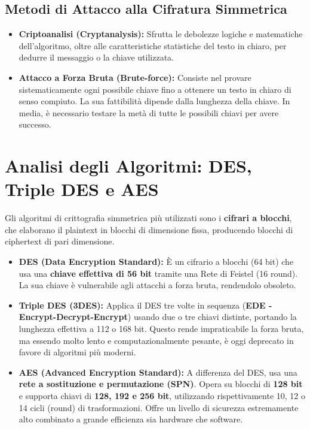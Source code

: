 \subsection{Metodi di Attacco alla Cifratura Simmetrica}
\begin{warnbox}
\begin{itemize}
    \item \textbf{Criptoanalisi (Cryptanalysis):} Sfrutta le debolezze logiche e matematiche dell'algoritmo, oltre alle caratteristiche statistiche del testo in chiaro, per dedurre il messaggio o la chiave utilizzata.
    \item \textbf{Attacco a Forza Bruta (Brute-force):} Consiste nel provare sistematicamente ogni possibile chiave fino a ottenere un testo in chiaro di senso compiuto. La sua fattibilità dipende dalla lunghezza della chiave. In media, è necessario testare la metà di tutte le possibili chiavi per avere successo.
\end{itemize}
\end{warnbox}

\section{Analisi degli Algoritmi: DES, Triple DES e AES}
Gli algoritmi di crittografia simmetrica più utilizzati sono i \textbf{cifrari a blocchi}, che elaborano il plaintext in blocchi di dimensione fissa, producendo blocchi di ciphertext di pari dimensione.

\begin{defbox}
\begin{itemize}
    \item \textbf{DES (Data Encryption Standard):} È un cifrario a blocchi (64 bit) che usa una \textbf{chiave effettiva di 56 bit} tramite una Rete di Feistel (16 round). La sua chiave è vulnerabile agli attacchi a forza bruta, rendendolo obsoleto.
    \item \textbf{Triple DES (3DES):} Applica il DES tre volte in sequenza (\textbf{EDE - Encrypt-Decrypt-Encrypt}) usando due o tre chiavi distinte, portando la lunghezza effettiva a 112 o 168 bit. Questo rende impraticabile la forza bruta, ma essendo molto lento e computazionalmente pesante, è oggi deprecato in favore di algoritmi più moderni.
    \item \textbf{AES (Advanced Encryption Standard):} A differenza del DES, usa una \textbf{rete a sostituzione e permutazione (SPN)}. Opera su blocchi di \textbf{128 bit} e supporta chiavi di \textbf{128, 192 e 256 bit}, utilizzando rispettivamente 10, 12 o 14 cicli (round) di trasformazioni. Offre un livello di sicurezza estremamente alto combinato a grande efficienza sia hardware che software.
\end{itemize}
\end{defbox}

